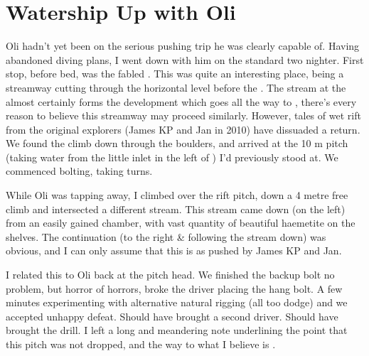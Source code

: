 




\section{Watership Up with Oli}

Oli hadn't yet been on the serious pushing trip he was clearly capable
of. Having abandoned diving plans, I went down with him on the standard
two nighter. First stop, before bed, was the fabled . This was
quite an interesting place, being a streamway cutting through the  horizontal level before the . The 
stream at the  almost certainly forms the development which
goes all the way to , there's every reason to
believe this streamway may proceed similarly. However, tales of wet rift
from the original explorers (James KP and Jan in 2010) have dissuaded a
return. We found the climb down through the boulders, and arrived at the
10 m pitch (taking water from the little inlet in the left of ) I'd previously stood at. We commenced bolting, taking
turns.


While Oli was tapping away, I climbed over the rift pitch, down a 4
metre free climb and intersected a different stream. This stream came
down (on the left) from an easily gained chamber, with vast quantity of
beautiful haemetite on the shelves. The continuation (to the right \&
following the stream down) was obvious, and I can only assume that this
is  as pushed by James KP and Jan.

I related this to Oli back at the pitch head. We finished the backup
bolt no problem, but horror of horrors, broke the driver placing the
hang bolt. A few minutes experimenting with alternative natural rigging
(all too dodge) and we accepted unhappy defeat. Should have brought a
second driver. Should have brought the drill. I left a long and
meandering note underlining the point that this pitch was not dropped,
and the way to what I believe is .

